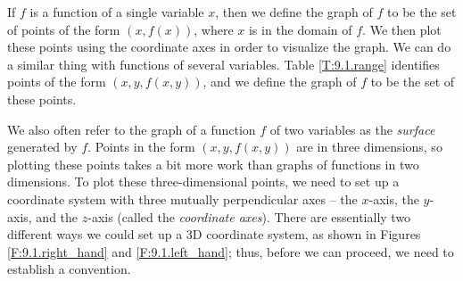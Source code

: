 



If $f$ is a function of a single variable $x$, then we define the
graph of $f$ to be the set of points of the form $(x,f(x))$, where $x$
is in the domain of $f$. We then plot these points using the
coordinate axes in order to visualize the graph. We can do a similar
thing with functions of several variables. Table \ref{T:9.1.range}
identifies points of the form $(x,y,f(x,y))$, and we define the graph
of $f$ to be the set of these points.

 \vspace*{5pt}
\nin {}
\vspace*{5pt}

We also often refer to the graph of a function $f$ of two variables as
the \emph{surface} generated by $f$. Points in
the form $(x,y,f(x,y))$ are in three dimensions, so plotting these
points takes a bit more work than graphs of functions in two
dimensions. To plot these three-dimensional points, we need to set up
a coordinate system with three mutually perpendicular axes -- the
$x$-axis, the $y$-axis, and the $z$-axis (called the \emph{coordinate
  axes}). There are essentially two different ways we could set up a
3D coordinate system, as shown in Figures \ref{F:9.1.right_hand} and
\ref{F:9.1.left_hand}; thus, before we can proceed, we need to
establish a convention.


